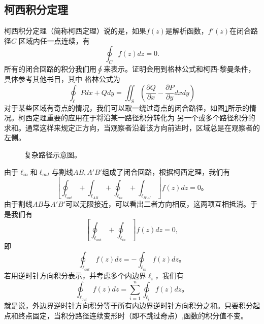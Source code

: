 \subsection{柯西积分定理}
\label{subsec:cauchy_theorem}
柯西积分定理（简称柯西定理）说的是，如果$f(z)$是解析函数，$f'(z)$在闭合路径$C$%
区域内任一点连续，有
\begin{equation}
    \oint_C f(z) dz = 0.
\end{equation}
所有的闭合回路的积分我们用$\oint$来表示。证明会用到格林公式和柯西-黎曼条件，具体参考其他书目，其中
格林公式为
\begin{equation}
    \oint_\ell P dx + Q dy = \iint_S \left( \frac{\partial Q}{\partial x} - \frac{\partial P}{\partial y} dx dy \right)
\end{equation}
对于某些区域有奇点的情况，我们可以取一绕过奇点的闭合路径，如图\ref{fig:complexregion}所示的情况。柯西定理重要的应用在于将沿某一路径积分转化为
另一个或多个路径积分的求和。通常这样来规定正方向，当观察者沿着该方向前进时，区域总是在观察者的左侧。
\begin{figure}
    \centering
    
    \caption{复杂路径示意图。}
    \label{fig:complexregion}
\end{figure}
由于$\ell_{in}$和$\ell_{out}$与割线$AB,A'B'$组成了闭合回路，根据柯西定理，我们有
\[
    \left[ \oint _{\ell_{out}} + \int _{\ell_{AB}} + \oint _{\ell_{in}} + \int _{\ell_{B'A'}} \right] f(z) dz = 0 \textrm{。}
\]   
由于割线$AB$与$A'B'$可以无限接近，可以看出二者方向相反，这两项互相抵消。于是我们有
\[
    \left[ \oint _{\ell_{out}} + \oint _{\ell_{in}}  \right] f(z) dz = 0,
\]
即
\[
    \oint_{\ell_{out}} f(z) dz = - \oint _{\ell_{in}}f(z) dz \textrm{。}
\]
若用逆时针方向积分表示，并考虑多个内边界$\ell_{i}$，我们有
\begin{equation}
    \ointctrclockwise_{\ell_{out}} f(z) dz = \sum_{i=1}^{n} \ointctrclockwise_{\ell_{i}} f(z) dz \textrm{。}
\end{equation}
就是说，外边界逆时针方向积分等于所有内边界逆时针方向积分之和。只要积分起点和终点固定，当积分路径连续变形时（即不跳过奇点）,函数的积分值不变。

